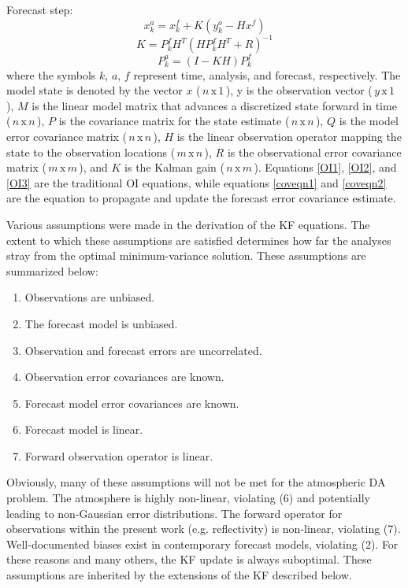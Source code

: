 \noindent Forecast step:
\begin{equation}
\label{OI2}
   x_k^a = x_k^f + K(y_k^o - Hx^f)
\end{equation}
\begin{equation}
\label{OI3}
   K = P_k^fH^T(HP_k^fH^T + R)^{-1}
\end{equation}
\begin{equation}
\label{coveqn2}
   P_k^a = (I-KH)P_k^f
\end{equation}
\noindent where the symbols \( k \), \( a \), \( f \) represent time, analysis, and forecast, respectively. The model state is denoted by the vector \( x \) (\(\,n\,\mathrm{x}\,1\,\)), y is the observation vector (\(\,y\,\mathrm{x}\,1\,\)), \( M \) is the linear model matrix that advances a discretized state forward in time (\(\,n\,\mathrm{x}\,n\,\)), \( P \) is the covariance matrix for the state estimate (\(\,n\,\mathrm{x}\,n\,\)), \( Q \) is the model error covariance matrix (\(\,n\,\mathrm{x}\,n\,\)), \( H \) is the linear observation operator mapping the state to the observation locations (\(\,m\,\mathrm{x}\,n\,\)), \( R \) is the observational error covariance matrix (\(\,m\,\mathrm{x}\,m\,\)), and \( K \) is the Kalman gain (\(\,n\,\mathrm{x}\,m\,\)). Equations \ref{OI1}, \ref{OI2}, and \ref{OI3}  are the traditional OI equations, while equations \ref{coveqn1} and \ref{coveqn2} are the equation to propagate and update the forecast error covariance estimate.

Various assumptions were made in the derivation of the KF equations. The extent to which these assumptions are satisfied determines how far the analyses stray from the optimal minimum-variance solution. These assumptions are summarized below:

\begin{enumerate}
\OUsinglespace
\item Observations are unbiased.
\item The forecast model is unbiased.
\item Observation and forecast errors are uncorrelated.
\item Observation error covariances are known.
\item Forecast model error covariances are known.
\item Forecast model is linear.
\item Forward observation operator is linear.
\end{enumerate}

Obviously, many of these assumptions will not be met for the atmospheric DA problem. The atmosphere is highly non-linear, violating (6) and potentially leading to non-Gaussian error distributions.
The forward operator for observations within the present work (e.g. reflectivity) is non-linear, violating (7). Well-documented biases exist in contemporary forecast models, violating (2). For these reasons and many others, the KF update is always suboptimal. These assumptions are inherited by the extensions of the KF described below.

